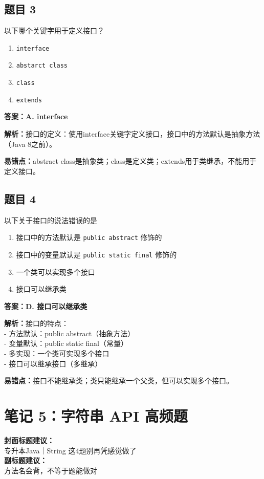 \documentclass[12pt,a4paper]{ctexart}
\begin{document}
\subsection*{题目 3}
以下哪个关键字用于定义接口？
\begin{enumerate}[label=\Alph*.]
	\item \texttt{interface}
	\item \texttt{abstarct class}
	\item \texttt{class}
	\item \texttt{extends}
\end{enumerate}

\begin{answerbox}
	\textbf{答案：A. interface}

	\textbf{解析：}接口的定义：使用interface关键字定义接口，接口中的方法默认是抽象方法（Java 8之前）。

	\textbf{易错点：}abstract class是抽象类；class是定义类；extends用于类继承，不能用于定义接口。
\end{answerbox}

\subsection*{题目 4}
以下关于接口的说法错误的是
\begin{enumerate}[label=\Alph*.]
	\item 接口中的方法默认是 \texttt{public abstract} 修饰的
	\item 接口中的变量默认是 \texttt{public static final} 修饰的
	\item 一个类可以实现多个接口
	\item 接口可以继承类
\end{enumerate}

\begin{answerbox}
	\textbf{答案：D. 接口可以继承类}

	\textbf{解析：}接口的特点：\\
	- 方法默认：public abstract（抽象方法）\\
	- 变量默认：public static final（常量）\\
	- 多实现：一个类可实现多个接口\\
	- 接口可以继承接口（多继承）

	\textbf{易错点：}接口不能继承类；类只能继承一个父类，但可以实现多个接口。
\end{answerbox}

\newpage

\section{笔记 5：字符串 API 高频题}
\begin{coverbox}
	\textbf{封面标题建议：}\\
	专升本Java｜String 这4题别再凭感觉做了\\
	\textbf{副标题建议：}\\
	方法名会背，不等于题能做对
\end{coverbox}
\end{document}
